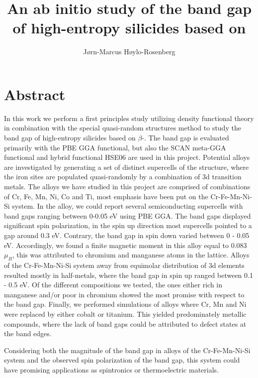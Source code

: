 \documentclass[UKenglish]{ifimaster}  %
\title{An ab initio study of the band gap of high-entropy silicides based on \ch{FeSi2}}        %
\author{Jørn-Marcus Høylo-Rosenberg}                      %
\begin{document}
\duoforside[dept={Department of Chemistry},   %
  program={Materials Science for Energy and Nanotechnology},  %
  long]                                        %

\frontmatter{}  

\chapter*{Abstract}                   %

In this work we perform a first principles study utilizing density functional theory in combination with the special quasi-random structures method to study the band gap of high-entropy silicides based on $\beta$-. The band gap is evaluated primarily with the PBE GGA functional, but also the SCAN meta-GGA functional and hybrid functional HSE06 are used in this project. Potential alloys are investigated by generating a set of distinct supercells of the  structure, where the iron sites are populated quasi-randomly by a combination of 3d transition metals. The alloys we have studied in this project are comprised of combinations of Cr, Fe, Mn, Ni, Co and Ti, most emphasis have been put on the Cr-Fe-Mn-Ni-Si system. In the  alloy, we could report several semiconducting supercells with band gaps ranging between 0-0.05 eV using PBE GGA. The band gaps displayed significant spin polarization, in the spin up direction most supercells pointed to a gap around 0.3 eV. Contrary, the band gap in spin down varied between 0 - 0.05 eV. Accordingly, we found a finite magnetic moment in this alloy equal to 0.083 $\mu_B$, this was attributed to chromium and manganese atoms in the lattice. Alloys of the Cr-Fe-Mn-Ni-Si system away from equimolar distribution of 3d elements resulted mostly in half-metals, where the band gap in spin up ranged between 0.1 - 0.5 eV. Of the different compositions we tested, the ones either rich in manganese and/or poor in chromium showed the most promise with respect to the band gap. Finally, we performed simulations of alloys where Cr, Mn and Ni were replaced by either cobalt or titanium. This yielded predominately metallic compounds, where the lack of band gaps could be attributed to defect states at the band edges.

Considering both the magnitude of the band gap in alloys of the Cr-Fe-Mn-Ni-Si system and the observed spin polarization of the band gap, this system could have promising applications as spintronics or thermoelectric materials.        
\end{document}

